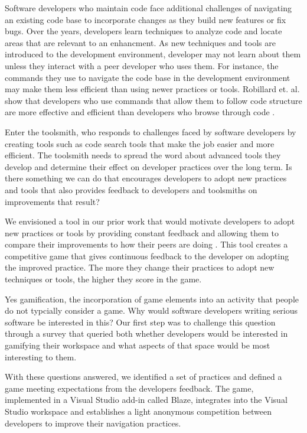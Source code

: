 \documentclass{sig-alternate}
\begin{document}
Software developers who maintain code face additional challenges of navigating an existing code base to incorporate changes as they build new features or fix bugs.  Over the years, developers learn techniques to analyze code and locate areas that are relevant to an enhancment.  As new techniques and tools are introduced to the development environment, developer may not learn about them unless they interact with a peer developer who uses them\cite{wbsnipes:Hill2011Peer}.    For instance, the commands they use to navigate the code base in the development environment may make them less efficient than using newer practices or tools.  Robillard et. al. show that developers who use commands that allow them to follow code structure are more effective and efficient than developers who browse through code \cite{wbsnipes:Robillard2004How}.   

Enter the toolsmith,  who responds to challenges faced by software developers by creating tools such as code search tools that make the job easier and more efficient.  The toolsmith needs to spread the word about advanced tools they develop and determine their effect on developer practices over the long term.  Is there something we can do that encourages developers to adopt new practices and tools that also provides feedback to developers and toolsmiths on improvements that result?  

We envisioned a tool in our prior work that would motivate developers to adopt new practices or tools by providing constant feedback and allowing them to compare their improvements to how their peers are doing  \cite{Snipes2013Towards}.  This tool creates a competitive game that gives continuous feedback to the developer on adopting the improved practice.  The more they change their practices to adopt new techniques or tools, the higher they score in the game. 

Yes gamification, the incorporation of game elements into an activity that people do not typcially consider a game\cite{2013Oxford}.  Why would software developers writing serious software be interested in this?  Our first step was to challenge this question through a survey that queried both whether developers would be interested in gamifying their workspace and what aspects of that space would be most interesting to them.

With these questions answered, we identified a set of practices and defined a game meeting expectations from the developers feedback.  The game, implemented in a Visual Studio add-in called Blaze, integrates into the Visual Studio workspace and establishes a light anonymous competition between developers to improve their navigation practices. 
\end{document}
